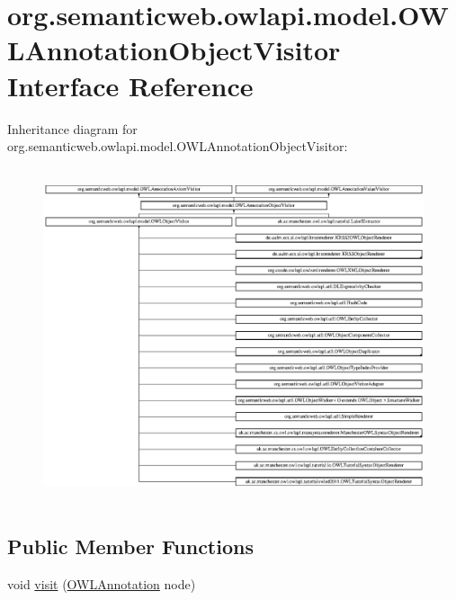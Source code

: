 \hypertarget{interfaceorg_1_1semanticweb_1_1owlapi_1_1model_1_1_o_w_l_annotation_object_visitor}{\section{org.\-semanticweb.\-owlapi.\-model.\-O\-W\-L\-Annotation\-Object\-Visitor Interface Reference}
\label{interfaceorg_1_1semanticweb_1_1owlapi_1_1model_1_1_o_w_l_annotation_object_visitor}
}
Inheritance diagram for org.\-semanticweb.\-owlapi.\-model.\-O\-W\-L\-Annotation\-Object\-Visitor\-:\begin{figure}[H]
\begin{center}
\leavevmode
\includegraphics[height=9.851851cm]{interfaceorg_1_1semanticweb_1_1owlapi_1_1model_1_1_o_w_l_annotation_object_visitor}
\end{center}
\end{figure}
\subsection*{Public Member Functions}
\begin{DoxyCompactItemize}
\item 
void \hyperlink{interfaceorg_1_1semanticweb_1_1owlapi_1_1model_1_1_o_w_l_annotation_object_visitor_a2795da8c789d20d0dddfbf6d901b07bb}{visit} (\hyperlink{interfaceorg_1_1semanticweb_1_1owlapi_1_1model_1_1_o_w_l_annotation}{O\-W\-L\-Annotation} node)
\end{DoxyCompactItemize}


